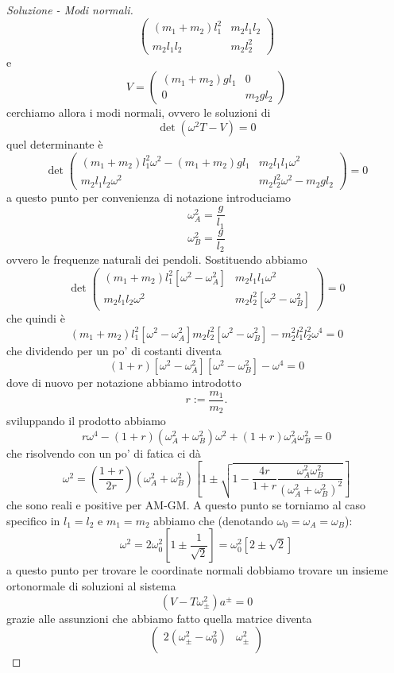 \documentclass[11pt]{scrartcl}
\begin{document}
\begin{sol}
\begin{proof}[Soluzione - Modi normali]
$$\begin{pmatrix}
				(m_1+m_2)l_1^2 & m_2l_1l_2 \\
				m_2l_1l_2 & m_2l_2^2
			\end{pmatrix}
			$$
			e 
			$$
			V=
			\begin{pmatrix}
				(m_1+m_2)gl_1 & 0 \\
				0 & m_2gl_2
			\end{pmatrix}
			$$
			cerchiamo allora i modi normali, ovvero le soluzioni di 
			$$\det\left(\omega^2T-V\right)=0$$
			quel determinante è
			$$\det
			\begin{pmatrix}
				\left(m_1+m_2\right)l_1^2\omega^2 -(m_1+m_2)gl_1 & m_2l_1l_1\omega^2 \\
				m_2l_1l_2\omega^2 & m_2l_2^2\omega^2-m_2gl_2
			\end{pmatrix}=0
			$$
			a questo punto per convenienza di notazione introduciamo
			$$\omega_A^2=\frac{g}{l_1}$$
			$$\omega_B^2=\frac{g}{l_2}$$
			ovvero le frequenze naturali dei pendoli. Sostituendo abbiamo
			$$\det
			\begin{pmatrix}
				\left(m_1+m_2\right)l_1^2\left[\omega^2-\omega^2_A\right] & m_2l_1l_1\omega^2 \\
				m_2l_1l_2\omega^2 & m_2l_2^2\left[\omega^2-\omega^2_B\right]
			\end{pmatrix}=0
			$$
			che quindi è
			$$\left(m_1+m_2\right)l_1^2\left[\omega^2-\omega^2_A\right]m_2l_2^2\left[\omega^2-\omega^2_B\right]-m_2^2l_1^2l_2^2\omega^4=0$$
			che dividendo per un po' di costanti diventa
			$$\left(1+r\right)\left[\omega^2-\omega^2_A\right]\left[\omega^2-\omega^2_B\right]-\omega^4=0$$
			dove di nuovo per notazione abbiamo introdotto
			$$r:=\frac{m_1}{m_2}.$$
			sviluppando il prodotto abbiamo
			$$r\omega^4-(1+r)(\omega_A^2+\omega_B^2)\omega^2+(1+r)\omega_A^2\omega_B^2=0$$
			che risolvendo con un po' di fatica ci dà
			$$\omega^2=\left(\frac{1+r}{2r}\right)\left(\omega_A^2+\omega_B^2\right)\left[1\pm\sqrt{1-\frac{4r}{1+r}\frac{\omega_A^2\omega_B^2}{\left(\omega_A^2+\omega_B^2\right)^2}}\right]$$
			che sono reali e positive per AM-GM. A questo punto se torniamo al caso specifico in $l_1=l_2$ e $m_1=m_2$ abbiamo che (denotando $\omega_0=\omega_A=\omega_B$):
			$$\omega^2=2\omega_0^2\left[1\pm\frac{1}{\sqrt{2}}\right]=\omega_0^2\left[2\pm \sqrt{2}\right]$$
			a questo punto per trovare le coordinate normali dobbiamo trovare un insieme ortonormale di soluzioni al sistema
			$$\left(V-T\omega^2_{\pm}\right)a^{\pm}=0$$
			grazie alle assunzioni che abbiamo fatto quella matrice diventa
			$$\begin{pmatrix}
				2\left(\omega_\pm^2-\omega_0^2\right) & \omega_\pm^2 \\

\end{pmatrix}$$
\end{proof}
\end{sol}
\end{document}
